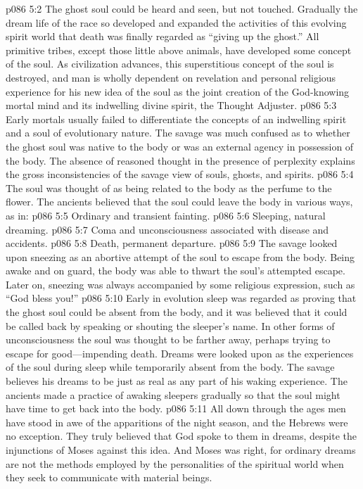\vs p086 5:2 The ghost soul could be heard and seen, but not touched. Gradually the dream life of the race so developed and expanded the activities of this evolving spirit world that death was finally regarded as “giving up the ghost.” All primitive tribes, except those little above animals, have developed some concept of the soul. As civilization advances, this superstitious concept of the soul is destroyed, and man is wholly dependent on revelation and personal religious experience for his new idea of the soul as the joint creation of the God\hyp{}knowing mortal mind and its indwelling divine spirit, the Thought Adjuster.
\vs p086 5:3 Early mortals usually failed to differentiate the concepts of an indwelling spirit and a soul of evolutionary nature. The savage was much confused as to whether the ghost soul was native to the body or was an external agency in possession of the body. The absence of reasoned thought in the presence of perplexity explains the gross inconsistencies of the savage view of souls, ghosts, and spirits.
\vs p086 5:4 The soul was thought of as being related to the body as the perfume to the flower. The ancients believed that the soul could leave the body in various ways, as in:
\pc \vs p086 5:5 \bibnobreakspace Ordinary and transient fainting.
\vs p086 5:6 \bibnobreakspace Sleeping, natural dreaming.
\vs p086 5:7 \bibnobreakspace Coma and unconsciousness associated with disease and accidents.
\vs p086 5:8 \bibnobreakspace Death, permanent departure.
\pc \vs p086 5:9 The savage looked upon sneezing as an abortive attempt of the soul to escape from the body. Being awake and on guard, the body was able to thwart the soul’s attempted escape. Later on, sneezing was always accompanied by some religious expression, such as “God bless you!”
\pc \vs p086 5:10 Early in evolution sleep was regarded as proving that the ghost soul could be absent from the body, and it was believed that it could be called back by speaking or shouting the sleeper’s name. In other forms of unconsciousness the soul was thought to be farther away, perhaps trying to escape for good---impending death. Dreams were looked upon as the experiences of the soul during sleep while temporarily absent from the body. The savage believes his dreams to be just as real as any part of his waking experience. The ancients made a practice of awaking sleepers gradually so that the soul might have time to get back into the body.
\vs p086 5:11 All down through the ages men have stood in awe of the apparitions of the night season, and the Hebrews were no exception. They truly believed that God spoke to them in dreams, despite the injunctions of Moses against this idea. And Moses was right, for ordinary dreams are not the methods employed by the personalities of the spiritual world when they seek to communicate with material beings.
